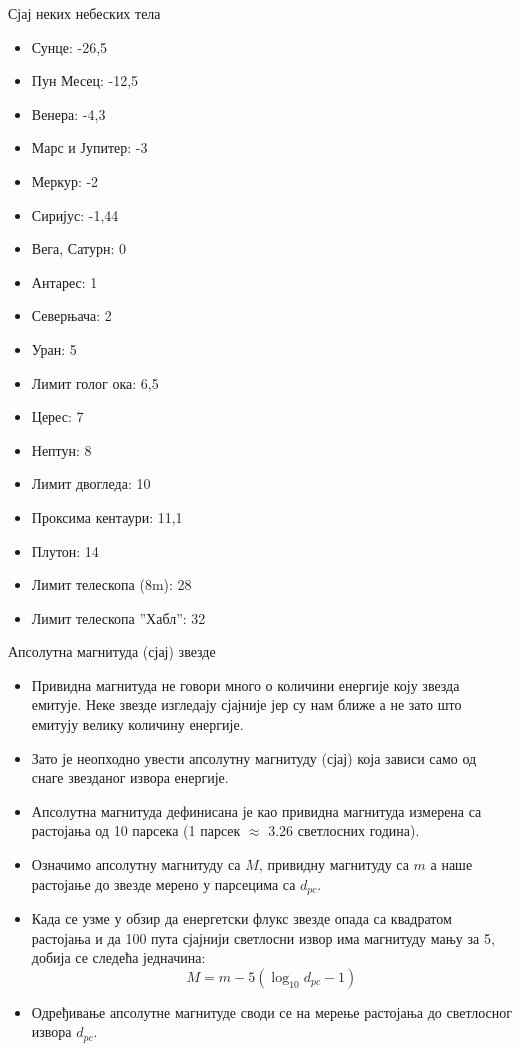 \documentclass[aspectratio=169, xcolor=table, 10pt]{beamer}
\theoremstyle{definition}
\begin{document}
\begin{frame}{Сјај неких небеских тела}
    \begin{multicols}{2}
    \begin{itemize}
      \item Сунце: -26,5
      \item Пун Месец: -12,5
      \item Венера: -4,3
      \item Марс и Јупитер: -3
      \item Меркур: -2
      \item Сиријус: -1,44
      \item Вега, Сатурн: 0
      \item Антарес: 1
      \item Северњача: 2
      \item Уран: 5
      \item Лимит голог ока: 6,5
      \item Церес: 7
      \item Нептун: 8
      \item Лимит двогледа: 10
      \item Проксима кентаури: 11,1
      \item Плутон: 14
      \item Лимит телескопа (8m): 28
      \item Лимит телескопа ”Хабл”: 32
    \end{itemize}
  \end{multicols}
\end{frame}

\begin{frame}{Апсолутна магнитуда (сјај) звезде}
  \begin{itemize}
    \item Привидна магнитуда не говори много о количини енергије коју звезда емитује. Неке звезде изгледају сјајније јер су нам ближе а не зато што емитују велику количину енергије.
    \item Зато је неопходно увести апсолутну магнитуду (сјај) која зависи само од снаге звезданог извора енергије.
    \item Апсолутна магнитуда дефинисана је као привидна магнитуда измерена са растојања од 10 парсека (1 парсек $\approx$ 3.26 светлосних година).
    \item Означимо апсолутну магнитуду са $M$, привидну магнитуду са $m$ а наше растојање до звезде мерено у парсецима са $d_{pc}$.
    \item Када се узме у обзир да енергетски флукс звезде опада са квадратом растојања и да 100 пута сјајнији светлосни извор има магнитуду мању за 5, добија се следећа једначина:
      \begin{equation*}
        M=m-5(\log_{10}d_{pc} - 1)
      \end{equation*}
    \item Одређивање апсолутне магнитуде своди се на мерење растојања до светлосног извора $d_{pc}$.
  \end{itemize}
\end{frame}
\end{document}
